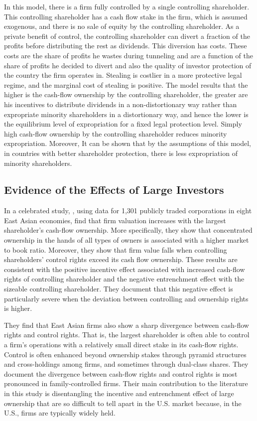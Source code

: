 \documentclass[final,1p,authoryear]{elsarticle}
\begin{document}
In this model, there is a firm fully controlled by a single controlling shareholder. This controlling shareholder has a cash flow stake in the firm, which is assumed exogenous, and there is no sale of equity by the controlling shareholder. As a private benefit of control, the controlling shareholder can divert a fraction of the profits before distributing the rest as dividends. This diversion has costs. These costs are the share of profits he wastes during tunneling and are a function of the share of profits he decided to divert and also the quality of investor protection of the country the firm operates in. Stealing is costlier in a more protective legal regime, and the marginal cost of stealing is positive. The model results that the higher is the cash-flow ownership by the controlling shareholder, the greater are his incentives to distribute dividends in a non-distortionary way rather than expropriate minority shareholders in a distortionary way, and hence the lower is the equilibrium level of expropriation for a fixed legal protection level. Simply high cash-flow ownership by the controlling shareholder reduces minority expropriation. Moreover, It can be shown that by the assumptions of this model, in countries with better shareholder protection, there is less expropriation of minority shareholders.

\subsection{Evidence of the Effects of Large Investors}

In a celebrated study, \cite{doi:10.1111/1540-6261.00511}, using data for 1,301 publicly traded corporations in eight East Asian economies, find that firm valuation increases with the largest shareholder's cash-flow ownership. More specifically, they show that concentrated ownership in the hands of all types of owners is associated with a higher market to book ratio. Moreover, they show that firm value falls when controlling shareholders' control rights exceed its cash flow ownership. These results are consistent with the positive incentive effect associated with increased cash-flow rights of controlling shareholder and the negative entrenchment effect with the sizeable controlling shareholder. They document that this negative effect is particularly severe when the deviation between controlling and ownership rights is higher. 

They find that East Asian firms also show a sharp divergence between cash-flow rights and control rights. That is, the largest shareholder is often able to control a firm's operations with a relatively small direct stake in its cash-flow rights. Control is often enhanced beyond ownership stakes through pyramid structures and cross-holdings among firms, and sometimes through dual-class shares. They document the divergence between cash-flow rights and control rights is most pronounced in family-controlled firms. Their main contribution to the literature in this study is disentangling the incentive and entrenchment effect of large ownership that are so difficult to tell apart in the U.S. market because, in the U.S., firms are typically widely held.
\end{document}
